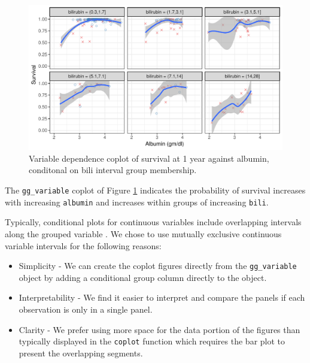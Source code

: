 \documentclass[article]{jss}
\begin{document}
\begin{Schunk}
\begin{figure}[!htb]

{\centering \includegraphics{fig-rfs/rfs-bili-coplot-1} 

}

\caption[Variable dependence coplot of survival at 1 year against albumin, conditonal on bili interval group membership]{Variable dependence coplot of survival at 1 year against albumin, conditonal on bili interval group membership.}\label{fig:bili-coplot}
\end{figure}
\end{Schunk}

The \texttt{gg\_variable} coplot of Figure \ref{fig:bili-coplot}
indicates the probability of survival increases with increasing
\texttt{albumin} and increases within groups of increasing
\texttt{bili}.

Typically, conditional plots for continuous variables include
overlapping intervals along the grouped variable \citep{cleveland:1993}.
We chose to use mutually exclusive continuous variable intervals for the
following reasons:

\begin{itemize}
\item
  Simplicity - We can create the coplot figures directly from the
  \texttt{gg\_variable} object by adding a conditional group column
  directly to the object.
\item
  Interpretability - We find it easier to interpret and compare the
  panels if each observation is only in a single panel.
\item
  Clarity - We prefer using more space for the data portion of the
  figures than typically displayed in the \texttt{coplot} function which
  requires the bar plot to present the overlapping segments.
\end{itemize}
\end{document}
